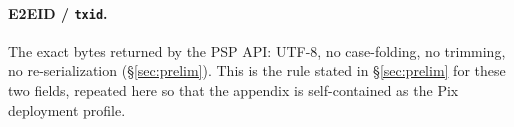 \documentclass[11pt]{article}
\newcommand{\code}[1]{\texttt{#1}}
\begin{document}
\paragraph{E2EID / \code{txid}.} The exact bytes returned by the PSP API:
UTF-8, no case-folding, no trimming, no re-serialization
(\S\ref{sec:prelim}). This is the rule stated in \S\ref{sec:prelim} for these
two fields, repeated here so that the appendix is self-contained as the Pix
deployment profile.
\end{document}
